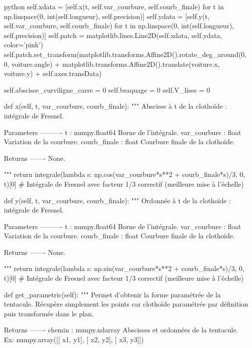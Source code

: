 \begin{mintedbox}{python}
        self.xdata = [self.x(t, self.var_courbure, self.courb_finale) for t in np.linspace(0, int(self.longueur), self.precision)]
        self.ydata = [self.y(t, self.var_courbure, self.courb_finale) for t in np.linspace(0, int(self.longueur), self.precision)]
        self.patch = matplotlib.lines.Line2D(self.xdata, self.ydata, color='pink')
        self.patch.set_transform(matplotlib.transforms.Affine2D().rotate_deg_around(0, 0, voiture.angle) + matplotlib.transforms.Affine2D().translate(voiture.x, voiture.y) + self.axes.transData)

        self.abscisse_curviligne_carre = 0
        self.braquage = 0
        self.V_lisse = 0

    def x(self, t, var_courbure, courb_finale):
        """
        Abscisse à t de la clothoïde : intégrale de Fresnel.

        Parameters
        ----------
        t : numpy.float64
            Borne de l'intégrale.
        var_courbure : float
            Variation de la courbure.
        courb_finale : float
            Courbure finale de la clothoïde.

        Returns
        -------
        None.

        """
        return integrale(lambda s: np.cos(var_courbure*s**2 + courb_finale*s)/3, 0, t)[0]  # Intégrale de Fresnel avec facteur 1/3 correctif (meilleure mise à l'échelle)

    def y(self, t, var_courbure, courb_finale):
        """
        Ordonnée à t de la clothoïde : intégrale de Fresnel.

        Parameters
        ----------
        t : numpy.float64
            Borne de l'intégrale.
        var_courbure : float
            Variation de la courbure.
        courb_finale : float
            Courbure finale de la clothoïde.

        Returns
        -------
        None.

        """
        return integrale(lambda s: np.sin(var_courbure*s**2 + courb_finale*s)/3, 0, t)[0]  # Intégrale de Fresnel avec facteur 1/3 correctif (meilleure mise à l'échelle)

    def get_parametric(self):
        """
        Permet d'obtenir la forme paramétrée de la tentacule. Récupère simplement les points car clothoïde paramétrée par définition puis transformée dans le plan.

        Returns
        -------
        chemin : numpy.ndarray
            Abscisses et ordonnées de la tentacule.
            Ex: numpy.array([[ x1,   y1],
                             [ x2,   y2],
                             [ x3,   y3]])


\end{mintedbox}
